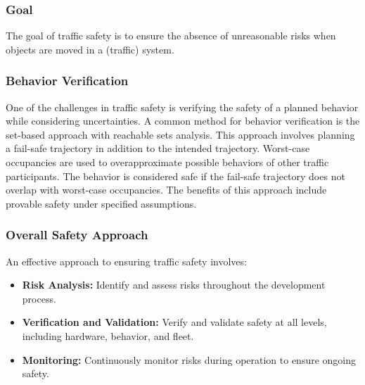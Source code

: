 \subsubsection*{Goal}
The goal of traffic safety is to ensure the absence of unreasonable risks when objects are moved in a (traffic) system.

\subsubsection*{Behavior Verification}
One of the challenges in traffic safety is verifying the safety of a planned behavior while considering uncertainties. A common method for behavior verification is the set-based approach with reachable sets analysis. This approach involves planning a fail-safe trajectory in addition to the intended trajectory. Worst-case occupancies are used to overapproximate possible behaviors of other traffic participants. The behavior is considered safe if the fail-safe trajectory does not overlap with worst-case occupancies. The benefits of this approach include provable safety under specified assumptions.

\subsubsection*{Overall Safety Approach}
An effective approach to ensuring traffic safety involves:
\begin{itemize}
    \item \textbf{Risk Analysis:} Identify and assess risks throughout the development process.
    \item \textbf{Verification and Validation:} Verify and validate safety at all levels, including hardware, behavior, and fleet.
    \item \textbf{Monitoring:} Continuously monitor risks during operation to ensure ongoing safety.
\end{itemize}
